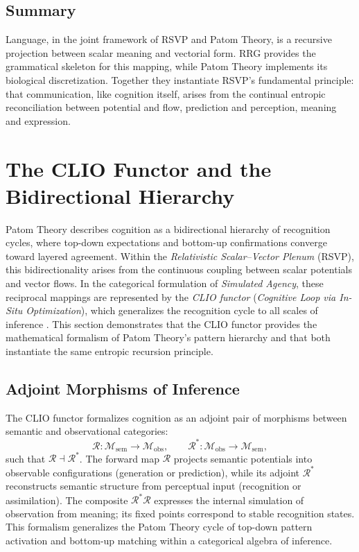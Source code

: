 \documentclass[11pt]{article}
\begin{document}
\subsection{Summary}
Language, in the joint framework of RSVP and Patom Theory, is a recursive projection between scalar meaning and vectorial form. RRG provides the grammatical skeleton for this mapping, while Patom Theory implements its biological discretization. Together they instantiate RSVP’s fundamental principle: that communication, like cognition itself, arises from the continual entropic reconciliation between potential and flow, prediction and perception, meaning and expression.

\section{The CLIO Functor and the Bidirectional Hierarchy}
Patom Theory describes cognition as a bidirectional hierarchy of recognition cycles, where top-down expectations and bottom-up confirmations converge toward layered agreement. Within the \textit{Relativistic Scalar--Vector Plenum} (RSVP), this bidirectionality arises from the continuous coupling between scalar potentials and vector flows. In the categorical formulation of \textit{Simulated Agency}, these reciprocal mappings are represented by the \textit{CLIO functor} (\textit{Cognitive Loop via In-Situ Optimization}), which generalizes the recognition cycle to all scales of inference \citep{cheng2025clio}. This section demonstrates that the CLIO functor provides the mathematical formalism of Patom Theory’s pattern hierarchy and that both instantiate the same entropic recursion principle.

\subsection{Adjoint Morphisms of Inference}
The CLIO functor formalizes cognition as an adjoint pair of morphisms between semantic and observational categories:
\begin{equation}
\mathcal{R} : \mathcal{M}_{\mathrm{sem}} \longrightarrow \mathcal{M}_{\mathrm{obs}},
\qquad
\mathcal{R}^{\ast} : \mathcal{M}_{\mathrm{obs}} \longrightarrow \mathcal{M}_{\mathrm{sem}},
\end{equation}
such that $\mathcal{R} \dashv \mathcal{R}^{\ast}$. The forward map $\mathcal{R}$ projects semantic potentials into observable configurations (generation or prediction), while its adjoint $\mathcal{R}^{\ast}$ reconstructs semantic structure from perceptual input (recognition or assimilation). The composite $\mathcal{R}^{\ast}\mathcal{R}$ expresses the internal simulation of observation from meaning; its fixed points correspond to stable recognition states. This formalism generalizes the Patom Theory cycle of top-down pattern activation and bottom-up matching within a categorical algebra of inference.
\end{document}
